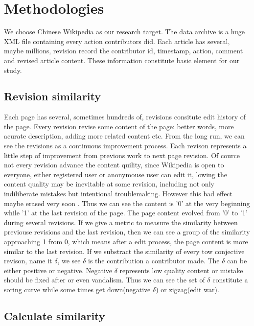 \documentclass{elsarticle}
\begin{document}
\section{Methodologies}
\label{sec:methodoligis}

We choose Chinese Wikipedia as our research target. The data archive
is  a huge XML file containing every action contributors did. Each
article has several, maybe millions, revision record the contributor
id, timestamp, action, comment and revised article content. These
information constitute basic element for our study.

\subsection{Revision similarity}
\label{sec:revision-similarity}

Each page has several, sometimes hundreds of, revisions consitute edit
history of the page. Every revision revise some content of the page:
better words, more acurate description, adding more related content
etc. From the long run, we can see the revisions as a continuous
improvement process. Each revison represents a little step of
improvement from previons work to next page revision. Of cource not
every revision advance the content quility, since Wikipedia is open to
everyone, either registered user or anonymouse user can edit it,
lowing the content quality may be inevitable at some revision,
including not
only  indiliberate mistakes but intentional troublemaking. However
this bad effect maybe erased very soon . Thus
we can see the content is '0' at the very beginning while '1' at the
last revision of the page. The page content evolved from '0' to '1'
during several revisions. If we give a metric to measure the
similarity between  previouse revisions and the last revision, then
we can see a group of the similarity   approaching 1 from 0, which
means after a edit process, the page content is more similar to the
last revision.  If we substract the similarity of every tow conjective
revison, name it $\delta$, we see $\delta$ is the contribution a
contributor made. The $\delta$ can be either positive or
negative. Negative $\delta$ represents low quality content or mistake
should be fixed after or even vandalism. Thus we can see the set of
$\delta$ constitute a soring curve while some times get down(negative
$\delta$) or zigzag(edit war).

\subsection{Calculate similarity}
\label{sec:calculate-similarity}
\end{document}
